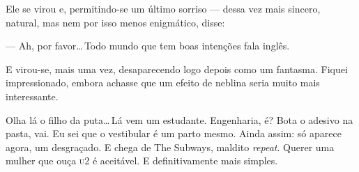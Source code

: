 Ele se virou e, permitindo-se um último sorriso --- dessa vez mais sincero, natural, mas nem por isso menos enigmático, disse:

--- Ah, por favor\ldots\,Todo mundo que tem boas intenções fala inglês.

E virou-se, mais uma vez, desaparecendo logo depois como um fantasma. Fiquei impressionado, embora achasse que um efeito de neblina seria muito mais interessante.

Olha lá o filho da puta\ldots\,Lá vem um estudante. Engenharia, é? Bota o adesivo na pasta, vai. Eu sei que o vestibular é um parto mesmo. Ainda assim: só aparece agora, um desgraçado. E chega de The Subways, maldito \emph{repeat}. Querer uma mulher que ouça \textsc{u}2 é aceitável. E definitivamente mais simples.
